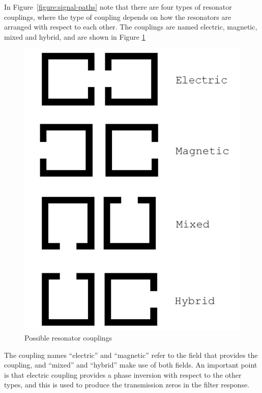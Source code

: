 In Figure~\ref{figure:signal-paths} note that there are four types of resonator couplings, where the type of coupling depends on how the resonators are arranged with respect to each other. The couplings are named electric, magnetic, mixed and hybrid, and are shown in Figure \ref{figure:design-couplings}

\begin{figure}[ht]
\begin{center}
\includegraphics[scale=0.3]{fig/design-couplings.pdf}
\end{center}
\caption{Possible resonator couplings}
\label{figure:design-couplings}
\end{figure}

The coupling names ``electric'' and ``magnetic'' refer to the field that provides the coupling, and ``mixed'' and ``hybrid'' make use of both fields. An important point is that electric coupling provides a phase inversion with respect to the other types, and this is used to produce the transmission zeros in the filter response.

